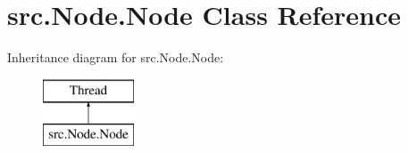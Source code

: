 \hypertarget{classsrc_1_1_node_1_1_node}{}\section{src.\+Node.\+Node Class Reference}
\label{classsrc_1_1_node_1_1_node}
Inheritance diagram for src.\+Node.\+Node\+:\begin{figure}[H]
\begin{center}
\leavevmode
\includegraphics[height=2.000000cm]{classsrc_1_1_node_1_1_node}
\end{center}
\end{figure}
